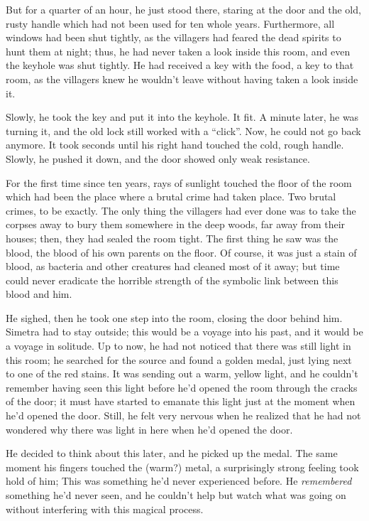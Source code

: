 But for a quarter of an hour, he just stood there, staring at the door and the old, rusty handle which had not been used for ten whole years. Furthermore, all windows had been shut tightly, as the villagers had feared the dead spirits to hunt them at night; thus, he had never taken a look inside this room, and even the keyhole was shut tightly. He had received a key with the food, a key to that room, as the villagers knew he wouldn't leave without having taken a look inside it.

Slowly, he took the key and put it into the keyhole. It fit.
A minute later, he was turning it, and the old lock still worked with a \enquote{click}. Now, he could not go back anymore. 
It took seconds until his right hand touched the cold, rough handle. Slowly, he pushed it down, and the door showed only weak resistance. 

For the first time since ten years, rays of sunlight touched the floor of the room which had been the place where a brutal crime had taken place. Two brutal crimes, to be exactly. The only thing the villagers had ever done was to take the corpses away to bury them somewhere in the deep woods, far away from their houses; then, they had sealed the room tight. 
The first thing he saw was the blood, the blood of his own parents on the floor. Of course, it was just a stain of blood, as bacteria and other creatures had cleaned most of it away; but time could never eradicate the horrible strength of the symbolic link between this blood and him.

He sighed, then he took one step into the room, closing the door behind him. Simetra had to stay outside; this would be a voyage into his past, and it would be a voyage in solitude. 
Up to now, he had not noticed that there was still light in this room; he searched for the source and found a golden medal, just lying next to one of the red stains. It was sending out a warm, yellow light, and he couldn't remember having seen this light before he'd opened the room through the cracks of the door; it must have started to emanate this light just at the moment when he'd opened the door. Still, he felt very nervous when he realized that he had not wondered why there was light in here when he'd opened the door.

He decided to think about this later, and he picked up the medal. The same moment his fingers touched the (warm?) metal, a surprisingly strong feeling took hold of him; This was something he'd never experienced before. He \emph{remembered} something he'd never seen, and he couldn't help but watch what was going on without interfering with this magical process.

